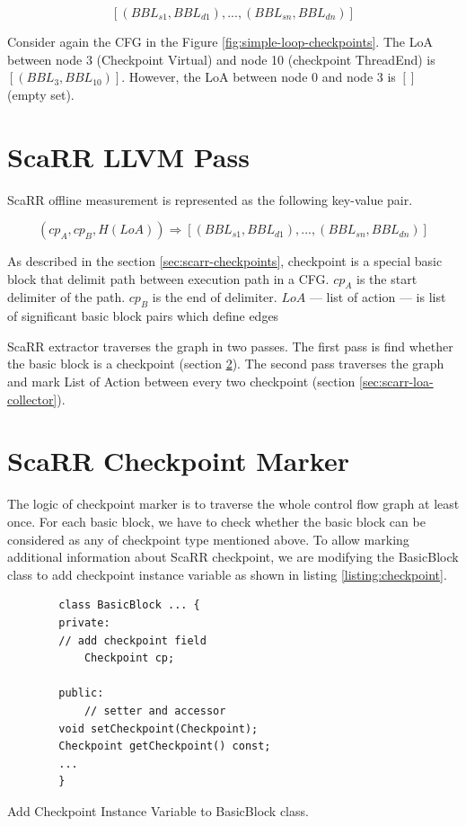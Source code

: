 $$[(BBL_{s1},BBL_{d1}),...,(BBL_{sn},BBL_{dn})]$$

Consider again the CFG in the Figure \ref{fig:simple-loop-checkpoints}. The LoA between node 3 (Checkpoint Virtual) and node 10 (checkpoint ThreadEnd) is  $[(BBL_3, BBL_{10})]$. However, the LoA between node 0 and node 3 is $[]$ (empty set).

\section{ScaRR LLVM Pass}

ScaRR offline measurement is represented as the following key-value pair.

$$(cp_A, cp_B, H(LoA)) \Rightarrow [(BBL_{s1}, BBL_{d1}), ..., (BBL_{sn}, BBL_{dn})]$$

As described in the section \ref{sec:scarr-checkpoints}, checkpoint is a special basic block that delimit path between execution path in a CFG. $cp_A$ is the start delimiter of the path. $cp_B$ is the end of delimiter. $LoA$ — list of action — is list of significant basic block pairs which define edges 

ScaRR extractor traverses the graph in two passes. The first pass is find whether the basic block is a checkpoint (section \ref{sec:scarr-checkpoint-marker}). The second pass traverses the graph and mark List of Action between every two checkpoint (section \ref{sec:scarr-loa-collector}). 

\section{ScaRR Checkpoint Marker} \label{sec:scarr-checkpoint-marker}

The logic of checkpoint marker is to traverse the whole control flow graph at least once. For each basic block, we have to check whether the basic block can be considered as any of checkpoint type mentioned above. To allow marking additional information about ScaRR checkpoint, we are modifying the BasicBlock class to add checkpoint instance variable as shown in listing \ref{listing:checkpoint}.

\begin{listing}[htbp]
    \begin{verbatim}
        class BasicBlock ... {
        private:
        // add checkpoint field
            Checkpoint cp;

        public:
            // setter and accessor
        void setCheckpoint(Checkpoint);
        Checkpoint getCheckpoint() const;
        ...
        }
    \end{verbatim}
    \caption{Add Checkpoint Instance Variable to BasicBlock class.}    
    \label{listing:checkpoint}
\end{listing}

